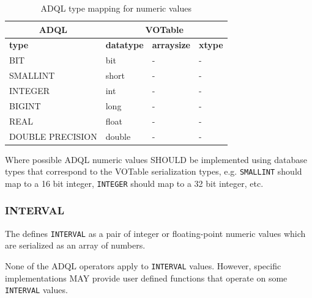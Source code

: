 \documentclass[11pt,a4paper]{ivoa}
\begin{document}
\begin{table}[h]\footnotesize
    \begin{tabular}
        {|p{}|p{}|p{}|p{}|}

        \hline
        \multicolumn{1}{|c|}{\textbf{ADQL}} &
        \multicolumn{3}{c|}{\textbf{VOTable}}
        \tabularnewline

        \hline
        \textbf{type} &
        \textbf{datatype} &
        \textbf{arraysize} &
        \textbf{xtype}
        \tabularnewline

        \hline
        BIT &
        bit &
        - &
        -
        \tabularnewline

        \hline
        SMALLINT &
        short &
        - &
        -
        \tabularnewline

        \hline
        INTEGER &
        int &
        - &
        -
        \tabularnewline

        \hline
        BIGINT &
        long &
        - &
        -
        \tabularnewline

        \hline
        REAL &
        float &
        - &
        -
        \tabularnewline

        \hline
        DOUBLE PRECISION &
        double &
        - &
        -
        \tabularnewline
        \hline
    \end{tabular}
    \caption{ADQL type mapping for numeric values}
    \label{table:types.numeric.primitive}
\end{table}

Where possible ADQL numeric values SHOULD be implemented using database types
that correspond to the VOTable serialization types, e.g. \verb:SMALLINT: should
map to a 16 bit integer, \verb:INTEGER: should map to a 32 bit integer, etc.

\subsubsection{INTERVAL}
\label{sec:types.numeric.interval}

The \DALISpec{} defines \verb:INTERVAL: as a pair of integer or floating-point
numeric values which are serialized as an array of numbers.

None of the ADQL operators apply to \verb:INTERVAL: values.
However, specific implementations MAY provide user defined functions that
operate on some \verb:INTERVAL: values.
\end{document}
